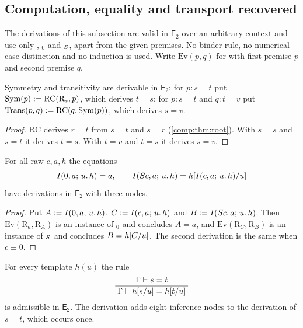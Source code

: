 \subsection{Computation, equality and transport recovered}
\label{comp:sec:evalrecover}

The derivations of this subsection are valid in $\mathsf{E}_2$ over an
arbitrary context and use only , $_0$ and
$_{S}$, apart from the given premises. No binder rule, no
numerical case distinction and no induction is used. Write
$\mathrm{Ev}(p,q)$ for  with first premise $p$ and second
premise $q$.

\begin{lemma}
\label{comp:lem:evalalg}
Symmetry and transitivity are derivable in $\mathsf{E}_2$: for
$p\colon s=t$ put $\mathrm{Sym}(p)\mathrel{:=}\mathrm{RC}(\mathrm{R}_s,p)$, which
derives $t=s$; for $p\colon s=t$ and $q\colon t=v$ put
$\mathrm{Trans}(p,q)\mathrel{:=}\mathrm{RC}(q,\mathrm{Sym}(p))$, which derives
$s=v$.
\end{lemma}

\begin{proof}
$\mathrm{RC}$ derives $r=t$ from $s=t$ and $s=r$
(\cref{comp:thm:root}). With $s=s$ and $s=t$ it derives $t=s$. With $t=v$
and $t=s$ it derives $s=v$.
\end{proof}

\begin{lemma}
\label{comp:lem:evalcomp}
For all raw $c,a,h$ the equations
\[
 I(0,a;\,u.\,h)=a,\qquad
 I(S c,a;\,u.\,h)=h[I(c,a;\,u.\,h)/u]
\]
have derivations in $\mathsf{E}_2$ with three nodes.
\end{lemma}

\begin{proof}
Put $A\mathrel{:=}I(0,a;\,u.\,h)$, $C\mathrel{:=}I(c,a;\,u.\,h)$ and
$B\mathrel{:=}I(S c,a;\,u.\,h)$. Then $\mathrm{Ev}(\mathrm{R}_a,\mathrm{R}_A)$
is an instance of $_0$ and concludes $A=a$, and
$\mathrm{Ev}(\mathrm{R}_C,\mathrm{R}_B)$ is an instance of
$_{S}$ and concludes $B=h[C/u]$. The second
derivation is the same when $c\equiv0$.
\end{proof}

\begin{theorem}
\label{comp:thm:evalcong}
For every template $h(u)$ the rule
\[
 \dfrac{\;\Gamma\vdash s=t\;}{\;\Gamma\vdash h[s/u]=h[t/u]\;}
\]
is admissible in $\mathsf{E}_2$. The derivation adds eight inference nodes to
the derivation of $s=t$, which occurs once.
\end{theorem}

